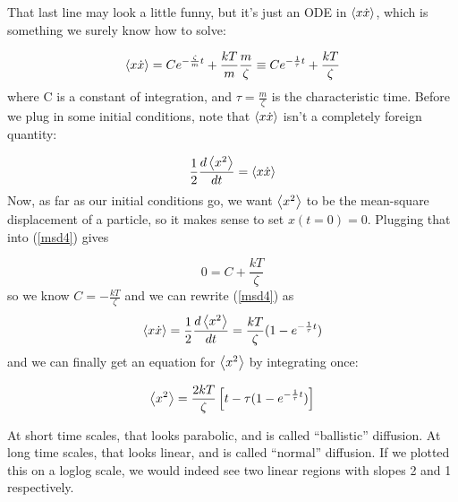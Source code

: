 \documentclass[12pt]{article}
\begin{document}
That last line may look a little funny, but it's just an ODE in
$\left< x\dot{x}\right>$, which is something we surely know how to
solve:

\begin{equation}
  \label{msd4}
  \left< x\dot{x}\right> = Ce^{-\frac{\zeta}{m} t} + \frac{kT}{m}\frac{m}{\zeta}
  \equiv Ce^{-\frac{1}{\tau} t} + \frac{kT}{\zeta}
\end{equation}
where C is a constant of integration, and $\tau = \frac{m}{\zeta}$ is the
characteristic time. Before we plug in some initial conditions, note
that $\left< x\dot{x}\right>$ isn't a completely foreign quantity:

\begin{equation}
  \label{x2xxd}
  \frac{1}{2}\frac{d \left< x^2\right>}{d t} = \left< x\dot{x}\right>
\end{equation}
Now, as far as our initial conditions go, we want $\left< x^2\right>$ to be
the mean-square displacement of a particle, so it makes sense to set
$x(t=0) = 0$. Plugging that into (\ref{msd4}) gives


\begin{equation}
  0 = C + \frac{kT}{\zeta}
\end{equation}
so we know $C=-\frac{kT}{\zeta}$ and we can rewrite (\ref{msd4}) as 
\begin{equation}
  \label{msd5}
  \left< x\dot{x}\right> = \frac{1}{2}\frac{d \left< x^2\right>}{d t} = \frac{kT}{\zeta}(1-e^{-\frac{1}{\tau} t})
\end{equation}
and we can finally get an equation for $\left< x^2\right>$ by integrating
once:

\begin{equation}
  \label{msdfull}
  \left< x^2\right> = \frac{2kT}{\zeta}\left[t-\tau(1-e^{-\frac{1}{\tau} t})\right]
\end{equation}


At short time scales, that looks parabolic, and is called
``ballistic'' diffusion. At long time scales, that looks linear, and
is called ``normal'' diffusion. If we plotted this on a loglog scale,
we would indeed see two linear regions with slopes 2 and 1
respectively.
\end{document}
